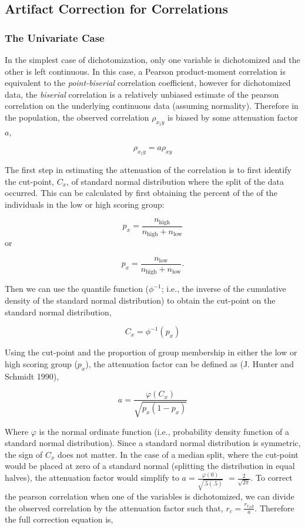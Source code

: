 \documentclass[
  letterpaper,
  DIV=11,
  numbers=noendperiod]{scrreprt}
\begin{document}
\hypertarget{sec-corr-artifacts}{%
\subsection{Artifact Correction for
Correlations}\label{sec-corr-artifacts}}

\hypertarget{the-univariate-case}{%
\subsubsection*{The Univariate Case}\label{the-univariate-case}}

In the simplest case of dichotomization, only one variable is
dichotomized and the other is left continuous. In this case, a Pearson
product-moment correlation is equivalent to the \emph{point-biserial}
correlation coefficient, however for dichotomized data, the
\emph{biserial} correlation is a relatively unbiased estimate of the
pearson correlation on the underlying continuous data (assuming
normality). Therefore in the population, the observed correlation
\(\rho_{x_\ddagger y}\) is biased by some attenuation factor \(a\),

\[
\rho_{x_\ddagger y} = a\rho_{xy}
\]

The first step in estimating the attenuation of the correlation is to
first identify the cut-point, \(C_x\), of standard normal distribution
where the split of the data occurred. This can be calculated by first
obtaining the percent of the of the individuals in the low or high
scoring group:

\[
p_x = \frac{ n_{\text{high}} }{n_{\text{high}} + n_{\text{low}}}
\] or

\[
p_x = \frac{ n_{\text{low}} }{n_{\text{high}} + n_{\text{low}}}.
\]

Then we can use the quantile function (\(\phi^{-1}\); i.e., the inverse
of the cumulative density of the standard normal distribution) to obtain
the cut-point on the standard normal distribution,

\[
C_x = \phi^{-1}(p_x)
\]

Using the cut-point and the proportion of group membership in either the
low or high scoring group (\(p_x\)), the attenuation factor can be
defined as (J. Hunter and Schmidt 1990),

\[
a =\frac{\varphi(C_x)}{\sqrt{p_x(1-p_x)}} 
\]

Where \(\varphi\) is the normal ordinate function (i.e., probability
density function of a standard normal distribution). Since a standard
normal distribution is symmetric, the sign of \(C_x\) does not matter.
In the case of a median split, where the cut-point would be placed at
zero of a standard normal (splitting the distribution in equal halves),
the attenuation factor would simplify to
\(a =\frac{\varphi(0)}{\sqrt{.5(.5)}}\) \(=\frac{2}{\sqrt{2\pi}}\). To
correct the pearson correlation when one of the variables is
dichotomized, we can divide the observed correlation by the attenuation
factor such that, \(r_c = \frac{r_{x_Dy}}{a}\). Therefore the full
correction equation is,
\end{document}
